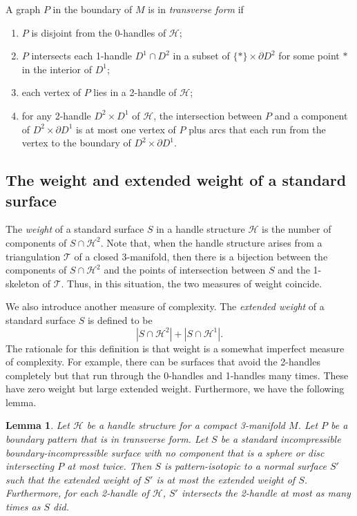 \documentclass[oneside]{amsart}
\numberwithin{equation}{section}
\theoremstyle{plain}
\newtheorem{lemma}[equation]{Lemma}
\theoremstyle{definition}
\begin{document}
A graph $P$ in the boundary of $M$ is in \emph{transverse form} if 
\begin{enumerate}
\item $P$ is disjoint from the 0-handles of $\mathcal{H}$;
\item $P$ intersects each 1-handle $D^1 \cap D^2$ in a subset of
$\{ \ast \} \times \partial D^2$ for some point $\ast$ in the interior of $D^1$;
\item each vertex of $P$ lies in a 2-handle of $\mathcal{H}$;
\item for any 2-handle $D^2 \times D^1$ of $\mathcal{H}$, the intersection between $P$
and a component of $D^2 \times \partial D^1$ is at most one vertex of $P$
plus arcs that each run from the vertex to the boundary of $D^2 \times \partial D^1$.
\end{enumerate}

\subsection{The weight and extended weight of a standard surface}
\label{Sec:WeightHS}

The \emph{weight} of a standard surface $S$ in a handle structure $\mathcal{H}$ is the number of components of $S \cap \mathcal{H}^2$.
Note that, when the handle structure arises from a triangulation $\mathcal{T}$ of a closed 3-manifold, then there is a
bijection between the components of $S \cap \mathcal{H}^2$ and the points of intersection
between $S$ and the 1-skeleton of $\mathcal{T}$. Thus, in this situation, the two measures of
weight coincide.

We also introduce another measure of complexity. The \emph{extended weight} of a standard surface $S$ is defined
to be
$$|S \cap \mathcal{H}^2| + |S \cap \mathcal{H}^1|.$$
The rationale for this definition is that weight is a somewhat imperfect measure of complexity. For example,
there can be surfaces that avoid the 2-handles completely but that run through the 0-handles and
1-handles many times. These have zero weight but large extended weight. Furthermore, we have the following lemma.

\begin{lemma}
\label{Lem:NormaliseHS}
Let $\mathcal{H}$ be a handle structure for a compact 3-manifold $M$. Let $P$ be a boundary pattern that
is in transverse form. Let $S$ be a standard incompressible boundary-incompressible surface with no component that is a
sphere or disc intersecting $P$ at most twice. Then $S$ is pattern-isotopic to a normal surface $S'$ such that the
extended weight of $S'$ is at most the extended weight of $S$. Furthermore, for each 2-handle of $\mathcal{H}$,
$S'$ intersects the 2-handle at most as many times as $S$ did.
\end{lemma}
\end{document}
